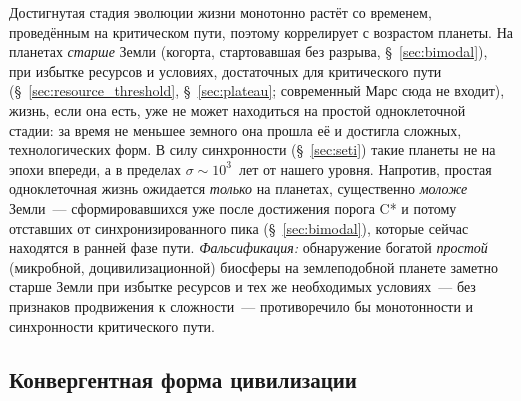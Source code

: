 \documentclass[12pt,a4paper]{article}
\begin{document}
Достигнутая стадия эволюции жизни монотонно растёт со временем, проведённым на критическом пути, поэтому коррелирует с возрастом планеты. На планетах \emph{старше} Земли (когорта, стартовавшая без разрыва, \S~\ref{sec:bimodal}), при избытке ресурсов и условиях, достаточных для критического пути (\S~\ref{sec:resource_threshold}, \S~\ref{sec:plateau}; современный Марс сюда не входит), жизнь, если она есть, уже не может находиться на простой одноклеточной стадии: за время не меньшее земного она прошла её и достигла сложных, технологических форм. В силу синхронности (\S~\ref{sec:seti}) такие планеты не на эпохи впереди, а в пределах $\sigma \sim 10^3$~лет от нашего уровня. Напротив, простая одноклеточная жизнь ожидается \emph{только} на планетах, существенно \emph{моложе} Земли~--- сформировавшихся уже после достижения порога C* и потому отставших от синхронизированного пика (\S~\ref{sec:bimodal}), которые сейчас находятся в ранней фазе пути. \emph{Фальсификация:} обнаружение богатой \emph{простой} (микробной, доцивилизационной) биосферы на землеподобной планете заметно старше Земли при избытке ресурсов и тех же необходимых условиях~--- без признаков продвижения к сложности~--- противоречило бы монотонности и синхронности критического пути.

\subsection{Конвергентная форма цивилизации}
\label{sec:pred_convergent_form}
\end{document}
